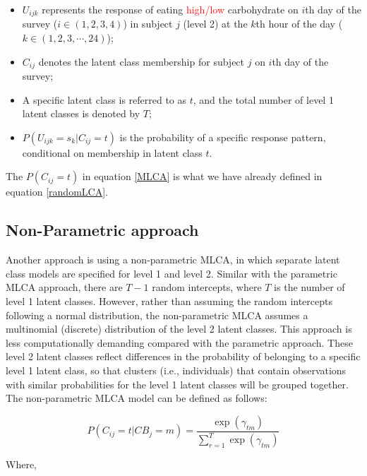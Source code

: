 \begin{itemize}
	\item $ U_{ijk} $ represents the response of eating \textcolor{red}{high/low} carbohydrate on $i$th day of the survey ($i \in (1,2,3,4)$) in subject $j$ (level 2) at the $k$th hour of the day ($k \in (1, 2, 3, \cdots, 24)$);
	\item $C_{ij}$ denotes the latent class membership for subject $j$ on $i$th day of the survey;
	\item A specific latent class is referred to as $t$, and the total number of level 1 latent classes is denoted by $T$;
	\item $P(U_{ijk} = s_k|C_{ij} = t)$ is the probability of a specific response pattern, conditional on membership in latent class $t$.
\end{itemize}


The $P(C_{ij} = t)$ in equation \ref{MLCA} is what we have already defined in equation \ref{randomLCA}.

\vspace{-0.5cm}
\subsection{Non-Parametric approach}\vspace{-0.3cm}


Another approach is using a non-parametric MLCA, in which separate latent class models are specified for level 1 and level 2. Similar with the parametric MLCA approach, there are $T-1$ random intercepts, where $T$ is the number of level 1 latent classes. However, rather than assuming the random intercepts following a normal distribution, the non-parametric MLCA assumes a multinomial (discrete) distribution of the level 2 latent classes. This approach is less computationally demanding compared with the parametric approach. These level 2 latent
classes reflect differences in the probability of belonging to a specific level 1 latent class, so that clusters (i.e., individuals) that contain observations with similar probabilities for the level 1 latent classes will be grouped together. The non-parametric MLCA model can be defined as follows: \vspace{-0.7cm}

\begin{equation}
P(C_{ij} = t | CB_j = m)  = \frac{\exp(\gamma_{tm})}{\sum_{r=1}^{T}\exp(\gamma_{tm})}
\end{equation}

Where, 


